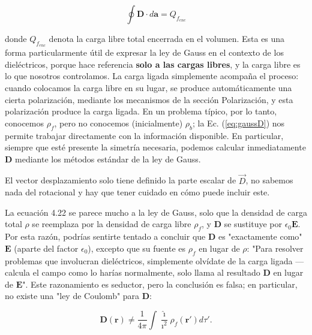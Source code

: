 \documentclass[12pt,a4paper]{report}
\newcommand{\esp}{\vspace{0.5cm}}
\begin{document}
	\begin{equation}
		\oint \mathbf{D} \cdot d\mathbf{a} = Q_{f_{enc}}
		\label{eq:gaussD}
	\end{equation}
	
	\esp
	
	donde $Q_{f_{enc}}$ denota la carga libre total encerrada en el volumen. Esta es una forma particularmente útil de expresar la ley de Gauss en el contexto de los dieléctricos, porque hace referencia \textbf{solo a las cargas libres}, y la carga libre es lo que nosotros controlamos. La carga ligada simplemente acompaña el proceso: cuando colocamos la carga libre en su lugar, se produce automáticamente una cierta polarización, mediante los mecanismos de la sección Polarización, y esta polarización produce la carga ligada. En un problema típico, por lo tanto, conocemos $\rho_f$, pero no conocemos (inicialmente) $\rho_b$; la Ec. (\ref{eq:gaussD}) nos permite trabajar directamente con la información disponible. En particular, siempre que esté presente la simetría necesaria, podemos calcular inmediatamente \textbf{D} mediante los métodos estándar de la ley de Gauss.
	
	\esp
	
	\begin{nota}
		El vector desplazamiento solo tiene definido la parte escalar de $\vec{D}$, no sabemos nada del rotacional y hay que tener cuidado en cómo puede incluir este.
	\end{nota}
	
	\esp
	
	La ecuación 4.22 se parece mucho a la ley de Gauss, solo que la densidad de carga total $\rho$ se reemplaza por la densidad de carga libre $\rho_f$, y $\mathbf{D}$ se sustituye por $\epsilon_0\mathbf{E}$. Por esta razón, podrías sentirte tentado a concluir que $\mathbf{D}$ es "exactamente como" $\mathbf{E}$ (aparte del factor $\epsilon_0$), excepto que su fuente es $\rho_f$ en lugar de $\rho$: "Para resolver problemas que involucran dieléctricos, simplemente olvídate de la carga ligada —calcula el campo como lo harías normalmente, solo llama al resultado $\mathbf{D}$ en lugar de $\mathbf{E}$". Este razonamiento es seductor, pero la conclusión es falsa; en particular, no existe una "ley de Coulomb" para \textbf{D}:
	
	\esp
	
	\begin{equation}
		\mathbf{D}(\mathbf{r}) \neq \frac{1}{4\pi} \int \frac{\hat{\imath}}{\imath^2} \rho_f(\mathbf{r}') d\tau'.
	\end{equation}
	
\end{document}
